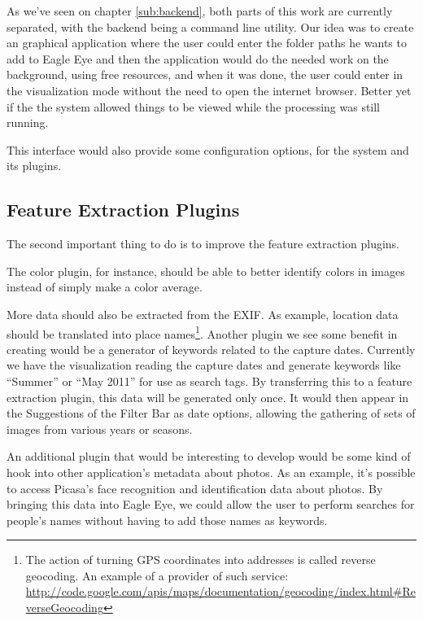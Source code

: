 As we've seen on chapter \ref{sub:backend}, both parts of this work are currently separated, with the backend being a command line utility. Our idea was to create an graphical application where the user could enter the folder paths he wants to add to Eagle Eye and then the application would do the needed work on the background, using free resources, and when it was done, the user could enter in the visualization mode without the need to open the internet browser. Better yet if the the system allowed things to be viewed while the processing was still running.

This interface would also provide some configuration options, for the system and its plugins.



\subsection{Feature Extraction Plugins} %
\label{sec:feature_extraction}

The second important thing to do is to improve the feature extraction plugins.

The color plugin, for instance, should be able to better identify colors in images instead of simply make a color average.

More data should also be extracted from the EXIF. As example, location data should be translated into place names\footnote{The action of turning GPS coordinates into addresses is called reverse geocoding. An example of a provider of such service: \url{http://code.google.com/apis/maps/documentation/geocoding/index.html\#ReverseGeocoding}}. Another plugin we see some benefit in creating would be a generator of keywords related to the capture dates. Currently we have the visualization reading the capture dates and generate keywords like ``Summer'' or ``May 2011'' for use as search tags. By transferring this to a feature extraction plugin, this data will be generated only once. It would then appear in the Suggestions of the Filter Bar as date options, allowing the gathering of sets of images from various years or seasons.

An additional plugin that would be interesting to develop would be some kind of hook into other application's metadata about photos. As an example, it's possible to access Picasa's face recognition and identification data about photos. By bringing this data into Eagle Eye, we could allow the user to perform searches for people's names without having to add those names as keywords.

